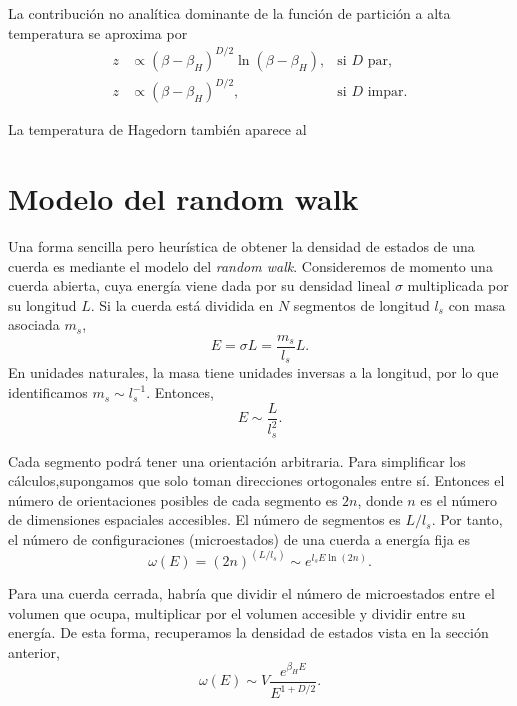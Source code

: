 La contribución no analítica dominante de la función de partición a alta temperatura se aproxima
por 
\begin{equation}
  \begin{aligned}
    z&\propto(\beta-\beta_H)^{D/2}\ln(\beta-\beta_H), &\text{si $D$ par,}\\
    z&\propto(\beta-\beta_H)^{D/2}, &\text{si $D$ impar}.
  \end{aligned}
  \label{eq:zp}
\end{equation}

La temperatura de Hagedorn también aparece al 

\section{Modelo del random walk}

Una forma sencilla pero heurística de obtener la densidad de estados 
de una cuerda es mediante el modelo del \emph{random walk}.
Consideremos de momento una cuerda abierta, 
cuya energía viene dada por su densidad lineal $\sigma$ multiplicada por su longitud $L$.
Si la cuerda está dividida en $N$ segmentos de longitud $l_s$ con masa asociada $m_s$, 
\begin{equation}
  E = \sigma L  =  \frac{m_s}{l_s} L.
\end{equation}
En unidades naturales, la masa tiene unidades inversas a la longitud, por lo que identificamos $m_s\sim l_s^{-1}$.
Entonces,
\begin{equation}
  E \sim \frac{L}{l_s^2}.
\end{equation}

Cada segmento podrá tener una orientación arbitraria. 
Para simplificar los cálculos,supongamos que solo toman direcciones ortogonales entre sí.
Entonces el número de orientaciones posibles de cada segmento es $2n$, donde $n$ es el número de dimensiones espaciales accesibles.
El número de segmentos es $L/l_s$.
Por tanto, el número de configuraciones (microestados) de una cuerda a energía fija es
\begin{equation}
  \omega(E)=(2n)^{(L/l_s)}\sim e^{l_s E \ln (2n)}.
\end{equation}


Para una cuerda cerrada, habría que dividir el número de microestados entre el 
volumen que ocupa, multiplicar por el volumen accesible y dividir entre su energía.
De esta forma, recuperamos la densidad de estados vista en la sección anterior,
\begin{equation}
  \omega(E)\sim V \frac{e^{\beta_H E}}{E^{1+D/2}}.
\end{equation}

